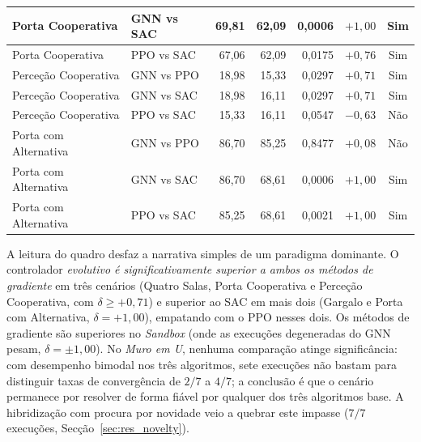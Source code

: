 \documentclass[12pt,reqno, twoside]{amsbook}
\theoremstyle{plain}
\numberwithin{equation}{chapter}
\numberwithin{section}{chapter}
\numberwithin{table}{chapter}
\numberwithin{figure}{chapter}
\begin{document}
\begin{table}[!htbp]
\begin{tabular}{|l|l|r|r|r|r|c|}
\hline
Porta Cooperativa & GNN vs SAC & 69,81 & 62,09 & 0,0006 & $+1{,}00$ & Sim \\
\hline
Porta Cooperativa & PPO vs SAC & 67,06 & 62,09 & 0,0175 & $+0{,}76$ & Sim \\
\hline
Perceção Cooperativa & GNN vs PPO & 18,98 & 15,33 & 0,0297 & $+0{,}71$ & Sim \\
\hline
Perceção Cooperativa & GNN vs SAC & 18,98 & 16,11 & 0,0297 & $+0{,}71$ & Sim \\
\hline
Perceção Cooperativa & PPO vs SAC & 15,33 & 16,11 & 0,0547 & $-0{,}63$ & Não \\
\hline
Porta com Alternativa & GNN vs PPO & 86,70 & 85,25 & 0,8477 & $+0{,}08$ & Não \\
\hline
Porta com Alternativa & GNN vs SAC & 86,70 & 68,61 & 0,0006 & $+1{,}00$ & Sim \\
\hline
Porta com Alternativa & PPO vs SAC & 85,25 & 68,61 & 0,0021 & $+1{,}00$ & Sim \\
\hline
\end{tabular}
\end{table}

A leitura do quadro desfaz a narrativa simples de um paradigma dominante. O controlador \emph{evolutivo é significativamente superior a ambos os métodos de gradiente} em três cenários (Quatro Salas, Porta Cooperativa e Perceção Cooperativa, com $\delta \geq +0{,}71$) e superior ao SAC em mais dois (Gargalo e Porta com Alternativa, $\delta = +1{,}00$), empatando com o PPO nesses dois. Os métodos de gradiente são superiores no \emph{Sandbox} (onde as execuções degeneradas do GNN pesam, $\delta = \pm 1{,}00$). No \emph{Muro em U}, nenhuma comparação atinge significância: com desempenho bimodal nos três algoritmos, sete execuções não bastam para distinguir taxas de convergência de $2/7$ a $4/7$; a conclusão é que o cenário permanece por resolver de forma fiável por qualquer dos três algoritmos base. A hibridização com procura por novidade veio a quebrar este impasse ($7/7$ execuções, Secção~\ref{sec:res_novelty}).
\end{document}
